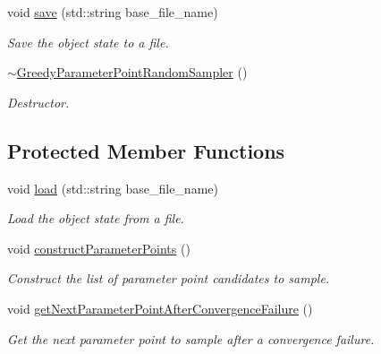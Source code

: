 \begin{DoxyCompactItemize}
void \hyperlink{class_c_a_r_o_m_1_1_greedy_parameter_point_random_sampler_a7e064b349a978a06a0b83ea40fa8f899}{save} (std\-::string base\-\_\-file\-\_\-name)
\begin{DoxyCompactList}\small\item\em Save the object state to a file. \end{DoxyCompactList}\item 
\hypertarget{class_c_a_r_o_m_1_1_greedy_parameter_point_random_sampler_af6ca31d285ded7b0f5b804111d6f813d}{\hyperlink{class_c_a_r_o_m_1_1_greedy_parameter_point_random_sampler_af6ca31d285ded7b0f5b804111d6f813d}{$\sim$\-Greedy\-Parameter\-Point\-Random\-Sampler} ()}\label{class_c_a_r_o_m_1_1_greedy_parameter_point_random_sampler_af6ca31d285ded7b0f5b804111d6f813d}

\begin{DoxyCompactList}\small\item\em Destructor. \end{DoxyCompactList}\end{DoxyCompactItemize}
\subsection*{Protected Member Functions}
\begin{DoxyCompactItemize}
\item 
void \hyperlink{class_c_a_r_o_m_1_1_greedy_parameter_point_random_sampler_ab2a16d3f4b72521feb0d553e0d120d3d}{load} (std\-::string base\-\_\-file\-\_\-name)
\begin{DoxyCompactList}\small\item\em Load the object state from a file. \end{DoxyCompactList}\item 
\hypertarget{class_c_a_r_o_m_1_1_greedy_parameter_point_random_sampler_ad5a7a8465c71b73b05a0f7963ab07d25}{void \hyperlink{class_c_a_r_o_m_1_1_greedy_parameter_point_random_sampler_ad5a7a8465c71b73b05a0f7963ab07d25}{construct\-Parameter\-Points} ()}\label{class_c_a_r_o_m_1_1_greedy_parameter_point_random_sampler_ad5a7a8465c71b73b05a0f7963ab07d25}

\begin{DoxyCompactList}\small\item\em Construct the list of parameter point candidates to sample. \end{DoxyCompactList}\item 
\hypertarget{class_c_a_r_o_m_1_1_greedy_parameter_point_random_sampler_adcb5cacab52cb0590f7a3927c2cccdb6}{void \hyperlink{class_c_a_r_o_m_1_1_greedy_parameter_point_random_sampler_adcb5cacab52cb0590f7a3927c2cccdb6}{get\-Next\-Parameter\-Point\-After\-Convergence\-Failure} ()}\label{class_c_a_r_o_m_1_1_greedy_parameter_point_random_sampler_adcb5cacab52cb0590f7a3927c2cccdb6}

\begin{DoxyCompactList}\small\item\em Get the next parameter point to sample after a convergence failure. \end{DoxyCompactList}\end{DoxyCompactItemize}
